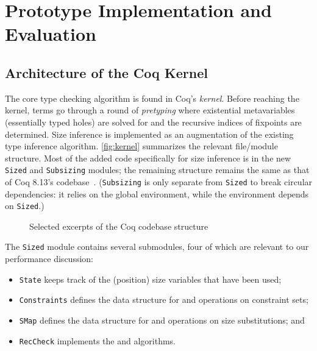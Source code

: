 \section{Prototype Implementation and Evaluation} \label{sec:impl}


\subsection{Architecture of the Coq Kernel}

The core type checking algorithm is found in Coq's \emph{kernel}.
Before reaching the kernel, terms go through a round of \emph{pretyping}
where existential metavariables (essentially typed holes) are solved for
and the recursive indices of fixpoints are determined.
Size inference is implemented as an augmentation of the existing type inference algorithm.
\autoref{fig:kernel} summarizes the relevant file/module structure.
Most of the added code specifically for size inference is in the new \texttt{Sized} and \texttt{Subsizing} modules;
the remaining structure remains the same as that of Coq 8.13's codebase~\citep{coq}.
(\texttt{Subsizing} is only separate from \texttt{Sized} to break circular dependencies: it relies on the global environment, while the environment depends on \texttt{Sized}.)

\begin{figure}
\caption{Selected excerpts of the Coq codebase structure}
\label{fig:kernel}
\end{figure}

The \texttt{Sized} module contains several submodules, four of which are relevant to our performance discussion:
\begin{itemize}
  \item \texttt{State} keeps track of the (position) size variables that have been used;
  \item \texttt{Constraints} defines the data structure for and operations on constraint sets;
  \item \texttt{SMap} defines the data structure for and operations on size substitutions; and
  \item \texttt{RecCheck} implements the \RecCheck and \solve algorithms.
\end{itemize}

